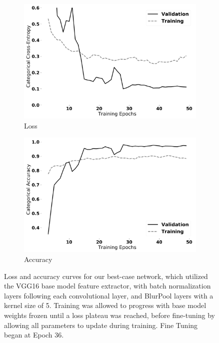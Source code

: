 \begin{figure}[ht]
	\centering
	\begin{subfigure}[b]{0.45\textwidth}
		\includegraphics[width=\textwidth]{./thesis_code/plots/20191011_BP_k5_BN_loss_bw.png}
		\caption{Loss}
		\label{fig:bestmodel_first_case}
	\end{subfigure}
	\begin{subfigure}[b]{0.45\textwidth}
		\includegraphics[width=\textwidth]{./thesis_code/plots/20191011_BP_k5_BN_acc_bw.png}
		\caption{Accuracy}
		\label{fig:bestmodel_second_case}
	\end{subfigure}
	\caption{Loss and accuracy curves for our best-case network, which utilized the VGG16 base model feature extractor, with batch normalization layers following each convolutional layer, and BlurPool layers with a kernel size of 5. Training was allowed to progress with base model weights frozen until a loss plateau was reached, before fine-tuning by allowing all parameters to update during training. Fine Tuning began at Epoch 36.}
	\label{fig:bestmodel_fig_sim}
\end{figure}

